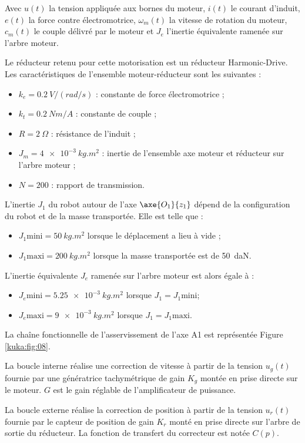 Avec $u(t)$ la tension appliquée aux bornes du moteur, $i(t)$ le courant d’induit, $e(t)$ la force 
contre électromotrice, $\omega_m(t)$ la vitesse de rotation du moteur, $c_m(t)$ le couple délivré par le 
moteur et $J_e$ l’inertie équivalente ramenée sur l’arbre moteur. 

Le réducteur retenu pour cette motorisation est un réducteur Harmonic-Drive. Les 
caractéristiques de l’ensemble moteur-réducteur sont les suivantes : 
\begin{itemize}
\item $k_e = \SI{0,2}{V/(rad/s)}$ : constante de force électromotrice ; 
\item $k_t = \SI{0,2}{Nm/A}$ : constante de couple ; 
\item $R = \SI{2}{\Omega}$ : résistance de l’induit ; 
\item $J_m = \SI{4e-3}{kg.m^2}$ : inertie de l’ensemble axe moteur et réducteur sur l'arbre moteur ; 
\item $N = 200$ : rapport de transmission. 
\end{itemize}

L’inertie $J_1$ du robot autour de l’axe $\axe{O_1}{z_1}$ dépend de la configuration du robot et de la masse
transportée. Elle est telle que : 
\begin{itemize}
\item $J_1 \text{mini} = \SI{50}{kg.m^2}$  lorsque le déplacement a lieu à vide ; 
\item $J_1 \text{maxi} = \SI{200}{kg.m^2}$  lorsque la masse transportée est de \SI{50}{daN}. 
\end{itemize}
L’inertie équivalente $J_e$ ramenée sur l’arbre moteur est alors égale à : 
\begin{itemize}
\item $J_e \text{mini} = \SI{5,25e-3}{kg.m^2}$  lorsque $J_1 = J_1 \text{mini}$; 
\item $J_e \text{maxi} = \SI{9e-3}{kg.m^2}$  lorsque $J_1 = J_1 \text{maxi}$. 
\end{itemize}

La chaîne fonctionnelle de l’asservissement de l’axe A1 est représentée Figure \ref{kuka:fig:08}. 

La boucle interne réalise une correction de vitesse à partir de la tension $u_g(t)$ fournie par une 
génératrice tachymétrique de gain $K_g$ montée en prise directe sur le moteur. $G$ est le gain 
réglable de l’amplificateur de puissance. 

La boucle externe réalise la correction de position à partir de la tension $u_r(t)$ fournie par le 
capteur de position de gain $K_r$ monté en prise directe sur l’arbre de sortie du réducteur. La 
fonction de transfert du correcteur est notée $C(p)$.

